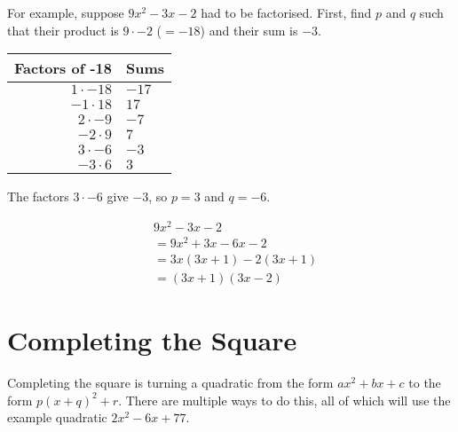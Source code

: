 For example, suppose $9x^2-3x-2$ had to be factorised. First, find $p$ and $q$ such that their product is $9 \cdot -2$ ($=-18$) and their sum is $-3$.

\medskip

\begin{tabular}{r | l}
	Factors of -18 & Sums\\
	\hline
	$1 \cdot -18$ & $-17$\\
	$-1 \cdot 18$ & $17$\\
	$2 \cdot -9$ & $-7$\\
	$-2 \cdot 9$ & $7$\\
	$3 \cdot -6$ & $-3$\\
	$-3 \cdot 6$ & $3$\\
\end{tabular}

The factors $3 \cdot -6$ give $-3$, so $p=3$ and $q=-6$.

\begin{align*}
	&9x^2-3x-2\\
	&=9x^2+3x-6x-2\\
	&=3x(3x+1)-2(3x+1)\\
	&=(3x+1)(3x-2)
\end{align*}


\section{Completing the Square}
Completing the square is turning a quadratic from the form $ax^2 + bx + c$ to the form $p(x + q)^2+r$. There are multiple ways to do this, all of which will use the example quadratic $2x^2-6x+77$.

